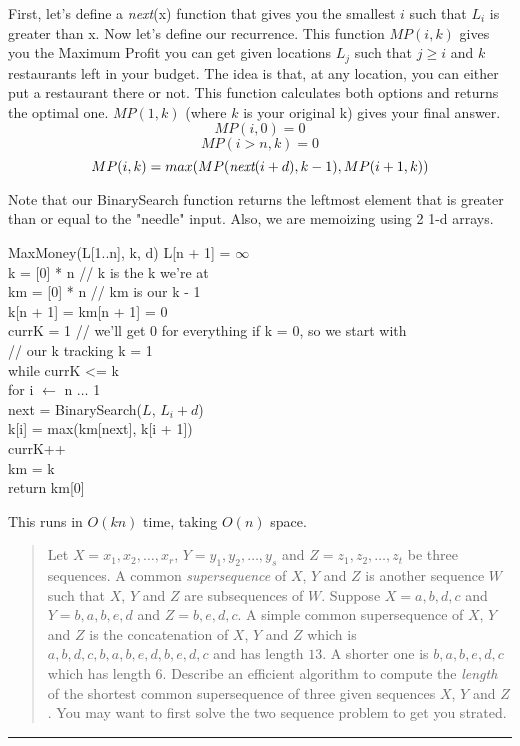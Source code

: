 \documentclass[11pt]{article}
\begin{document}
\begin{solution}
    First, let's define a \emph{next}(x) function that gives you the smallest $i$ such that $L_i$ is greater than x.
    Now let's define our recurrence. This function $MP(i, k)$ gives you the Maximum Profit you can get given locations $L_j$ such that $j \geq i$ and $k$ restaurants left in your budget. The idea is that, at any location, you can either put a restaurant there or not. This function calculates both options and returns the optimal one. $MP(1, k)$ (where $k$ is your original k) gives your final answer.
\[
    MP(i, 0) = 0
\]
\[
    MP(i > n, k) = 0
    \]
\[
    MP(i, k) = max(MP(\emph{next}(i + d), k - 1), MP(i + 1, k))
    \]

    Note that our BinarySearch function returns the leftmost element that is greater than or equal to the "needle" input. Also, we are memoizing using 2 1-d arrays.
    \begin{algo}
        MaxMoney(L[1..n], k, d) \+
        L[n + 1] = $\infty$
        \\ k = [0] * n // k is the k we're at 
        \\ km = [0] * n // km is our k - 1 
        \\ k[n + 1] = km[n + 1] = 0
        \\ currK = 1 // we'll get 0 for everything if k = 0, so we start with 
        \\ // our k tracking k = 1
        \\ while currK <= k \+
        \\ for i $\gets$ n $\ldots$ 1 \+
        \\ next = BinarySearch($L$, $L_i + d$)
        \\ k[i] = max(km[next], k[i + 1]) \-
        \\ currK++
        \\ km = k \-
        \\ return km[0]
    \end{algo}
    This runs in $O(kn)$ time, taking $O(n)$ space.
\end{solution}


\begin{quote}
Let $X = x_1,x_2,\ldots,x_r$, $Y = y_1,y_2,\ldots,y_s$ and $Z =
  z_1,z_2,\ldots,z_t$ be three sequences. A common {\em supersequence}
  of $X$, $Y$ and $Z$ is another sequence $W$ such that $X$, $Y$ and $Z$
  are subsequences of $W$. Suppose $X = a,b,d,c$ and $Y = b,a,b,e,d$ and $Z =
  b, e, d, c$. A simple common supersequence of $X$, $Y$ and $Z$ is
  the concatenation of $X$, $Y$ and $Z$ which is
  $a,b,d,c,b,a,b,e,d,b,e,d,c$ and has length $13$. A shorter one is
  $b, a, b, e, d, c$ which has length $6$.  Describe an efficient
  algorithm to compute the {\em length} of the shortest common
  supersequence of three given sequences $X$, $Y$ and $Z$. You may want to
  first solve the two sequence problem to get you strated.
\end{quote}
\hrule
\end{document}
